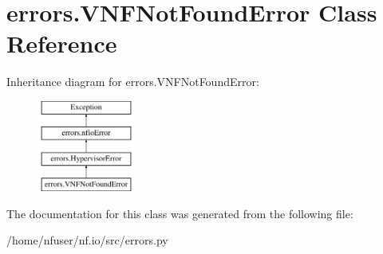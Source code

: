 \hypertarget{classerrors_1_1VNFNotFoundError}{\section{errors.\-V\-N\-F\-Not\-Found\-Error Class Reference}
\label{classerrors_1_1VNFNotFoundError}
}
Inheritance diagram for errors.\-V\-N\-F\-Not\-Found\-Error\-:\begin{figure}[H]
\begin{center}
\leavevmode
\includegraphics[height=3.000000cm]{classerrors_1_1VNFNotFoundError}
\end{center}
\end{figure}


The documentation for this class was generated from the following file\-:\begin{DoxyCompactItemize}
\item 
/home/nfuser/nf.\-io/src/errors.\-py\end{DoxyCompactItemize}
